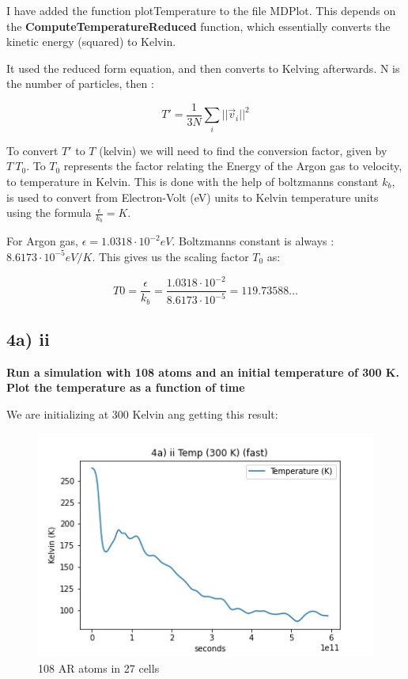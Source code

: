 \documentclass[a4paper,10pt,english]{article}
\begin{document}
I have added the function plotTemperature to the file MDPlot.  This depends on the \textbf{ComputeTemperatureReduced} function, which essentially converts the kinetic energy (squared) to Kelvin.

It used the reduced form equation, and then converts to Kelving afterwards. N is the number of particles, then :

\begin{equation}
T' = \frac{1}{3N} \sum_i  || \vec{v}_i||^2
\end{equation}

To convert $T'$ to $T$ (kelvin) we will need to find the conversion factor, given by  $T \ T_0$. To $T_0$ represents the  factor relating the Energy of the Argon gas to velocity, to temperature in Kelvin. This is done with the help of boltzmanns constant $k_b$, is used to convert from Electron-Volt (eV) units to Kelvin temperature units using the formula $\frac{\epsilon}{k_b} = K$.

For Argon gas, $\epsilon = 1.0318 \cdot 10^{-2} eV $. Boltzmanns constant is always : $8.6173 \cdot 10^{-5} eV/K$. This gives us the scaling factor $T_0$ as:

\begin{equation}
T0 = \frac{\epsilon}{k_b} = \frac{ 1.0318 \cdot 10^{-2} }{8.6173 \cdot 10^{-5}} = 119.73588\dots 
\end{equation}


\subsection*{4a) ii }
\textbf{Run a simulation with 108 atoms and an initial temperature of 300 K. Plot the temperature as a
function of time}

We are initializing at 300 Kelvin ang getting this result:

\begin{figure}[h!]
        \centering 
        \includegraphics[scale=0.6]{./py/4a_ii_fast.jpg} 
        \caption{108 AR atoms in 27 cells }
        \label{fig:3biv}
\end{figure}
\end{document}
